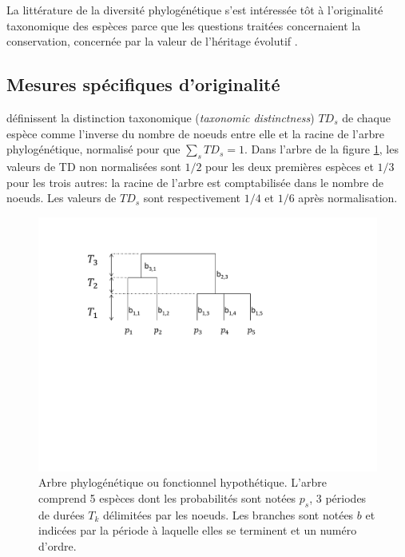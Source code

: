 \documentclass[
  11pt,
  french,
  a4paper,
  extrafontsizes,onecolumn,openright
  ]{memoir}
\begin{document}
La littérature de la diversité phylogénétique s'est intéressée tôt à l'originalité taxonomique des espèces parce que les questions traitées concernaient la conservation, concernée par la valeur de l'héritage évolutif \autocite{Faith2008}.

\hypertarget{mesures-spuxe9cifiques-doriginalituxe9}{%
\subsection{Mesures spécifiques d'originalité}\label{mesures-spuxe9cifiques-doriginalituxe9}}

\textcite{Vane-Wright1991} définissent la distinction taxonomique (\emph{taxonomic distinctness}) \(\mathit{TD}_s\) de chaque espèce comme l'inverse du nombre de noeuds entre elle et la racine de l'arbre phylogénétique, normalisé pour que \(\sum_s{\mathit{TD}_s} = 1\).
Dans l'arbre de la figure \ref{fig:ArbreA4}, les valeurs de TD non normalisées sont \({1}/{2}\) pour les deux premières espèces et \({1}/{3}\) pour les trois autres: la racine de l'arbre est comptabilisée dans le nombre de noeuds.
Les valeurs de \(\mathit{TD}_s\) sont respectivement \({1}/{4}\) et \({1}/{6}\) après normalisation.



\scriptsize

\begin{figure}

{\centering \includegraphics[width=0.8\linewidth]{images/ArbreA} 

}

\caption{Arbre phylogénétique ou fonctionnel hypothétique. L'arbre comprend 5 espèces dont les probabilités sont notées \(p_s\), 3 périodes de durées \(T_k\) délimitées par les noeuds. Les branches sont notées \(b\) et indicées par la période à laquelle elles se terminent et un numéro d'ordre.}\label{fig:ArbreA4}
\end{figure}
\end{document}
